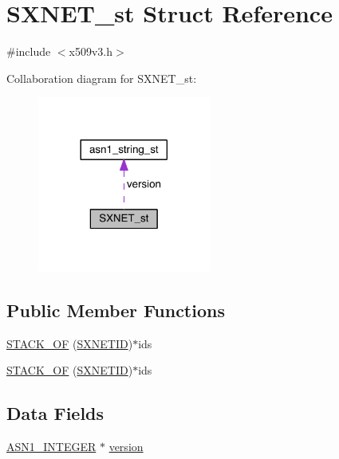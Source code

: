 \hypertarget{struct_s_x_n_e_t__st}{}\section{S\+X\+N\+E\+T\+\_\+st Struct Reference}
\label{struct_s_x_n_e_t__st}


{\ttfamily \#include $<$x509v3.\+h$>$}



Collaboration diagram for S\+X\+N\+E\+T\+\_\+st\+:\nopagebreak
\begin{figure}[H]
\begin{center}
\leavevmode
\includegraphics[width=161pt]{struct_s_x_n_e_t__st__coll__graph}
\end{center}
\end{figure}
\subsection*{Public Member Functions}
\begin{DoxyCompactItemize}
\item 
\hyperlink{struct_s_x_n_e_t__st_ab2132406fc47abc104fbb38663a4a3e8}{S\+T\+A\+C\+K\+\_\+\+OF} (\hyperlink{crypto_2x509v3_2x509v3_8h_a24fdf675662685173d32668916d5b361}{S\+X\+N\+E\+T\+ID})$\ast$ids
\item 
\hyperlink{struct_s_x_n_e_t__st_ab2132406fc47abc104fbb38663a4a3e8}{S\+T\+A\+C\+K\+\_\+\+OF} (\hyperlink{crypto_2x509v3_2x509v3_8h_a24fdf675662685173d32668916d5b361}{S\+X\+N\+E\+T\+ID})$\ast$ids
\end{DoxyCompactItemize}
\subsection*{Data Fields}
\begin{DoxyCompactItemize}
\item 
\hyperlink{crypto_2ossl__typ_8h_af4335399bf9774cb410a5e93de65998b}{A\+S\+N1\+\_\+\+I\+N\+T\+E\+G\+ER} $\ast$ \hyperlink{struct_s_x_n_e_t__st_abf367aeef355b6acf5be7c569c4b28b0}{version}
\end{DoxyCompactItemize}


